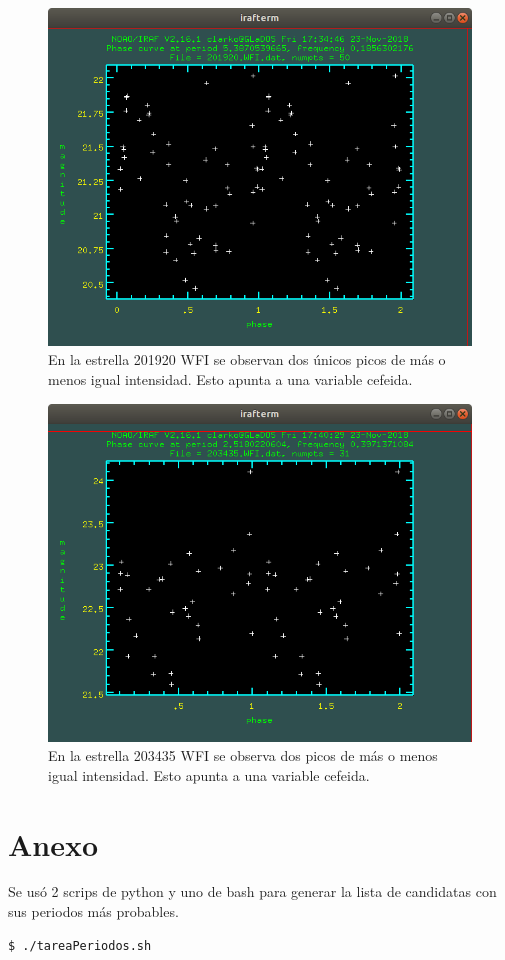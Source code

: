 \documentclass[12pt]{article}
\begin{document}
\begin{figure}[H]
  \centering
   \includegraphics[scale = 0.5]{201920.png}
  \caption{En la estrella 201920 WFI se observan dos únicos picos de más o menos igual intensidad. Esto apunta  a una variable cefeida.}
  \label{figura}
\end{figure}

\begin{figure}[H]
  \centering
  \includegraphics[scale = 0.5]{203435.png}
  \caption{En la estrella 203435 WFI se observa dos picos de más o menos igual intensidad. Esto apunta  a una variable cefeida.}
  \label{figura}
\end{figure}




%



\section{Anexo}
Se usó 2 scrips de python y uno de bash para generar la lista de candidatas con sus periodos más probables. 

\begin{lstlisting}[language=bash]
$ ./tareaPeriodos.sh
\end{lstlisting}
\end{document}
